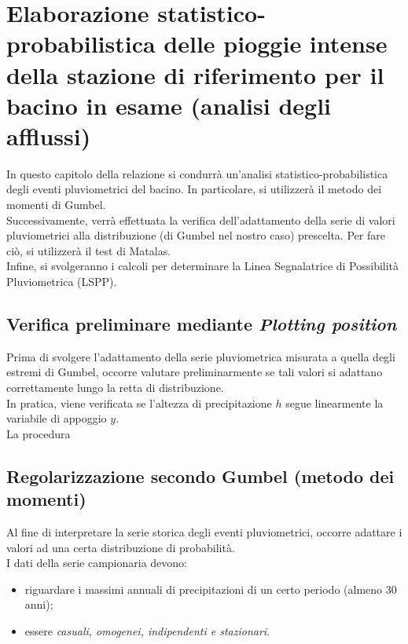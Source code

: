 \section{Elaborazione statistico-probabilistica delle pioggie intense della stazione di riferimento per il bacino in esame (analisi degli afflussi)}
In questo capitolo della relazione si condurrà un'analisi statistico-probabilistica degli eventi pluviometrici del bacino. In particolare, si utilizzerà il metodo dei momenti di Gumbel.\\
Successivamente, verrà effettuata la verifica dell'adattamento della serie di valori pluviometrici alla distribuzione (di Gumbel nel nostro caso) prescelta. Per fare ciò, si utilizzerà il test di Matalas.\\
Infine, si svolgeranno i calcoli per determinare la Linea Segnalatrice di Possibilità Pluviometrica (LSPP).

\subsection{Verifica preliminare mediante \textit{Plotting position}}
Prima di svolgere l'adattamento della serie pluviometrica misurata a quella degli estremi di Gumbel, occorre valutare preliminarmente se tali valori si adattano correttamente lungo la retta di distribuzione.\\
In pratica, viene verificata se l'altezza di precipitazione $h$ segue linearmente la variabile di appoggio $y$.\\
La procedura 

\subsection{Regolarizzazione secondo Gumbel (metodo dei momenti)}
Al fine di interpretare la serie storica degli eventi pluviometrici, occorre adattare i valori ad una certa distribuzione di probabilità.\\
I dati della serie campionaria devono: 
\begin{itemize}
    \item riguardare i massimi annuali di precipitazioni di un certo periodo (almeno 30 anni);
    \item essere \textit{casuali, omogenei, indipendenti e stazionari}.
\end{itemize}
